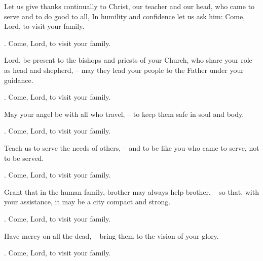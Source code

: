 \lettrine[loversize=0.15,lines=2]{L}{}et us give thanks continually to Christ, our teacher and our head, who came to serve and to do good to all, In humility and confidence let us ask him: Come, Lord, to visit your family.
\par \Rbar. Come, Lord, to visit your family.

Lord, be present to the bishops and priests of your Church, who share your role as head and shepherd,
– may they lead your people to the Father under your guidance.
\par \Rbar. Come, Lord, to visit your family.

May your angel be with all who travel,
– to keep them safe in soul and body.
\par \Rbar. Come, Lord, to visit your family.

Teach us to serve the needs of others,
– and to be like you who came to serve, not to be served.
\par \Rbar. Come, Lord, to visit your family.

Grant that in the human family, brother may always help brother,
– so that, with your assistance, it may be a city compact and strong.
\par \Rbar. Come, Lord, to visit your family.

Have mercy on all the dead,
– bring them to the vision of your glory.
\par \Rbar. Come, Lord, to visit your family.
